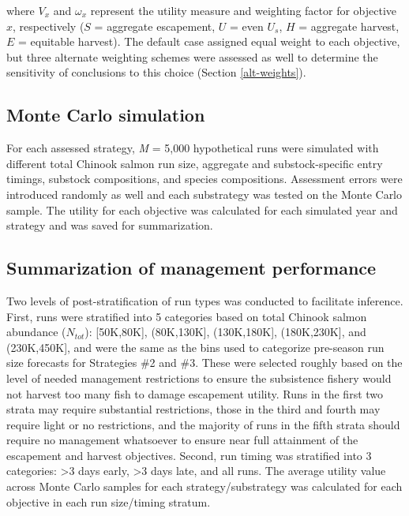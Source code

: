 \documentclass[12pt,]{book}
\theoremstyle{definition}
\theoremstyle{definition}
\theoremstyle{definition}
\theoremstyle{remark}
\begin{document}
\noindent
where \(V_x\) and \(\omega_x\) represent the utility measure and
weighting factor for objective \(x\), respectively (\(S\) = aggregate
escapement, \(U\) = even \(U_s\), \(H\) = aggregate harvest, \(E\) =
equitable harvest). The default case assigned equal weight to each
objective, but three alternate weighting schemes were assessed as well
to determine the sensitivity of conclusions to this choice (Section
\ref{alt-weights}).

\subsection{Monte Carlo simulation}\label{monte-carlo-simulation}

\noindent
For each assessed strategy, \emph{M} = 5,000 hypothetical runs were
simulated with different total Chinook salmon run size, aggregate and
substock-specific entry timings, substock compositions, and species
compositions. Assessment errors were introduced randomly as well and
each substrategy was tested on the Monte Carlo sample. The utility for
each objective was calculated for each simulated year and strategy and
was saved for summarization.

\subsection{Summarization of management
performance}\label{summarization-of-management-performance}

\noindent
Two levels of post-stratification of run types was conducted to
facilitate inference. First, runs were stratified into 5 categories
based on total Chinook salmon abundance (\(N_{tot}\)): {[}50K,80K{]},
(80K,130K{]}, (130K,180K{]}, (180K,230K{]}, and (230K,450K{]}, and were
the same as the bins used to categorize pre-season run size forecasts
for Strategies \#2 and \#3. These were selected roughly based on the
level of needed management restrictions to ensure the subsistence
fishery would not harvest too many fish to damage escapement utility.
Runs in the first two strata may require substantial restrictions, those
in the third and fourth may require light or no restrictions, and the
majority of runs in the fifth strata should require no management
whatsoever to ensure near full attainment of the escapement and harvest
objectives. Second, run timing was stratified into 3 categories:
\textgreater{}3 days early, \textgreater{}3 days late, and all runs. The
average utility value across Monte Carlo samples for each
strategy/substrategy was calculated for each objective in each run
size/timing stratum.
\end{document}
